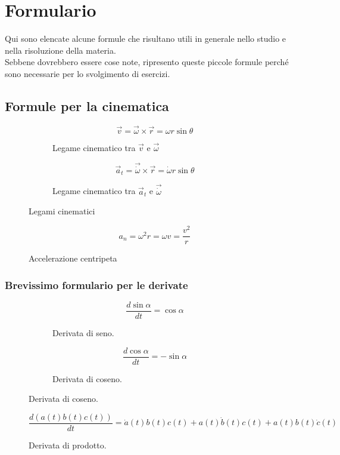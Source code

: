 \documentclass[main.tex]{subfiles}
\begin{document}
\chapter{Formulario}
Qui sono elencate alcune formule che risultano utili in generale nello studio e nella risoluzione della materia.
\\
Sebbene dovrebbero essere cose note, ripresento queste piccole formule perché sono necessarie per lo svolgimento di esercizi.
\section{Formule per la cinematica}
\begin{figure}[H]
  \begin{subfigure}[b]{.5\textwidth}
  \centering
\[
	\vec{v} = \vec{\omega}\times\vec{r} = \omega r \sin\theta
\]
  \caption{Legame cinematico tra $\vec{v}$ e $\vec{\omega}$}
  \end{subfigure}
  \hfill
  \begin{subfigure}[b]{.5\textwidth}
  \centering
\[
	\vec{a}_t = \vec{\dot{\omega}}\times\vec{r} = \dot{\omega} r \sin\theta
\]
  \caption{Legame cinematico tra $\vec{a}_t$ e $\vec{\dot{\omega}}$}
  \end{subfigure}
  \caption{Legami cinematici}
\end{figure}

\begin{figure}[H]
  \centering
\[
	a_n = \omega^2 r = \omega v = \dfrac{v^2}{r}
\]
  \caption{Accelerazione centripeta}
\end{figure}
\subsection{Brevissimo formulario per le derivate}
\begin{figure}[H]
  \begin{subfigure}[b]{.5\textwidth}
  \centering
\[
	\dfrac{d\sin\alpha}{dt} = \cos\alpha
\]
  \caption{Derivata di seno.}
  \end{subfigure}
  \hfill
  \begin{subfigure}[b]{.5\textwidth}
  \centering
\[
	\dfrac{d\cos\alpha}{dt} = -\sin\alpha
\]
  \caption{Derivata di coseno.}
  \end{subfigure}
\end{figure}

\begin{figure}[H]
  \centering
\[
	\dfrac{d(a(t)b(t)c(t))}{dt} = \dot{a}(t)b(t)c(t) + a(t)\dot{b}(t)c(t) + a(t)b(t)\dot{c}(t)
\]
  \caption{Derivata di prodotto.}
\end{figure}
\end{document}
